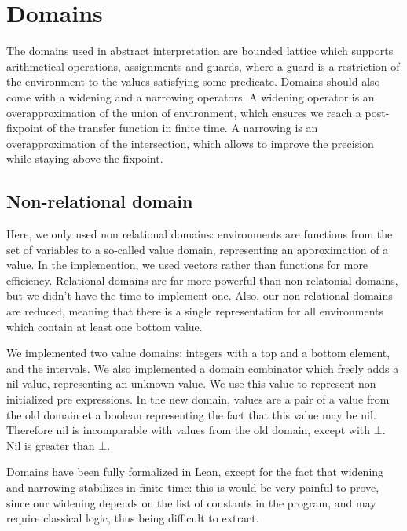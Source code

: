 \documentclass{scrartcl}
\begin{document}
\section{Domains}

The domains used in abstract interpretation are bounded lattice which supports arithmetical
operations, assignments and guards, where a guard is a restriction of the environment to the
values satisfying some predicate. Domains should also come with a widening and a narrowing
operators. A widening operator is an overapproximation of the union of environment, which ensures
we reach a post-fixpoint of the transfer function in finite time. A narrowing is an
overapproximation of the intersection, which allows to improve the precision while staying above
the fixpoint.

\subsection{Non-relational domain}
Here, we only used non relational domains: environments are functions from the set of variables
to a so-called value domain, representing an approximation of a value. In the implemention, we
used vectors rather than functions for more efficiency. Relational domains are far more powerful
than non relatonial domains, but we didn't have the time to implement one. Also, our non
relational domains are reduced, meaning that there is a single representation for all
environments which contain at least one bottom value.

We implemented two value domains: integers with a top and a bottom element, and the intervals. We
also implemented a domain combinator which freely adds a nil value, representing an unknown
value. We use this value to represent non initialized pre expressions. In the new domain, values
are a pair of a value from the old domain et a boolean representing the fact that this value may
be nil. Therefore nil is incomparable with values from the old domain, except with $\bot$. Nil is
greater than $\bot$.

Domains have been fully formalized in Lean, except for the fact that widening and narrowing
stabilizes in finite time: this is would be very painful to prove, since our widening depends on
the list of constants in the program, and may require classical logic, thus being difficult to
extract.
\end{document}
